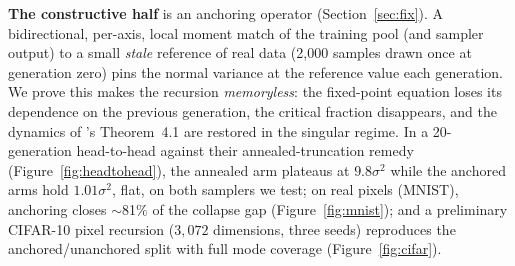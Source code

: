 \documentclass[11pt]{article}
\theoremstyle{remark}
\begin{document}
\textbf{The constructive half} is an anchoring operator (Section~\ref{sec:fix}). A
bidirectional, per-axis, local moment match of the training pool (and sampler output) to
a small \emph{stale} reference of real data (2{,}000 samples drawn once at generation
zero) pins the normal variance at the reference value each generation. We prove this
makes the recursion \emph{memoryless}: the fixed-point equation loses its dependence on
the previous generation, the critical fraction disappears, and the dynamics of
\citet{khelifa2026recursive}'s Theorem~4.1 are restored in the singular regime. In a
20-generation head-to-head against their annealed-truncation remedy
(Figure~\ref{fig:headtohead}), the annealed arm plateaus at $9.8\sigma^2$ while the
anchored arms hold $1.01\sigma^2$, flat, on both samplers we test; on real pixels
(MNIST), anchoring closes $\sim$81\% of the collapse gap (Figure~\ref{fig:mnist}); and a
preliminary CIFAR-10 pixel recursion ($3{,}072$ dimensions, three seeds) reproduces the
anchored/unanchored split with full mode coverage (Figure~\ref{fig:cifar}).
\end{document}
